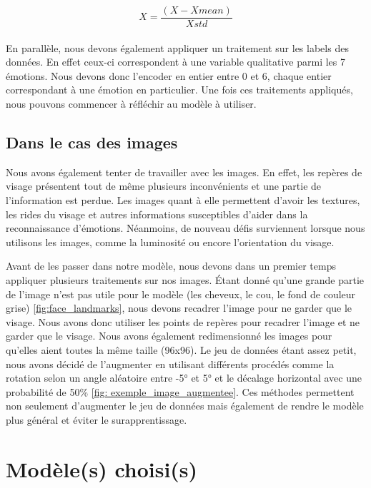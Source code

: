\documentclass{rapport}
\begin{document}
\begin{equation}
    X = \frac{(X - Xmean)} {Xstd}
\end{equation}\\

En parallèle, nous devons également appliquer un traitement sur les labels des données.
En effet ceux-ci correspondent à une variable qualitative parmi les 7 émotions.
Nous devons donc l'encoder en entier entre 0 et 6, chaque entier correspondant à une émotion en particulier.
Une fois ces traitements appliqués, nous pouvons commencer à réfléchir au modèle à utiliser.

\subsection{Dans le cas des images}
Nous avons également tenter de travailler avec les images.
En effet, les repères de visage présentent tout de même plusieurs inconvénients et une partie de l'information est perdue.
Les images quant à elle permettent d'avoir les textures,
les rides du visage et autres informations susceptibles d'aider dans la reconnaissance d'émotions.
Néanmoins, de nouveau défis surviennent lorsque nous utilisons les images, comme la luminosité ou encore l'orientation du visage.

Avant de les passer dans notre modèle, nous devons dans un premier temps appliquer plusieurs
traitements sur nos images. Étant donné qu'une grande partie de l'image n'est pas utile pour le modèle
(les cheveux, le cou, le fond de couleur grise) \ref*{fig:face_landmarks}, nous devons recadrer l'image
pour ne garder que le visage. Nous avons donc utiliser les points de repères pour recadrer l'image et
ne garder que le visage. Nous avons également redimensionné les images pour qu'elles aient toutes la même taille (96x96).
Le jeu de données étant assez petit, nous avons décidé de l'augmenter en utilisant différents procédés comme la
rotation selon un angle aléatoire entre -5° et 5° et le décalage horizontal avec une probabilité de 50\% \ref*{fig: exemple_image_augmentee}.
Ces méthodes permettent non seulement d'augmenter le jeu de données mais également de rendre le modèle plus général
et éviter le surapprentissage.


\section{Modèle(s) choisi(s)}
\end{document}
